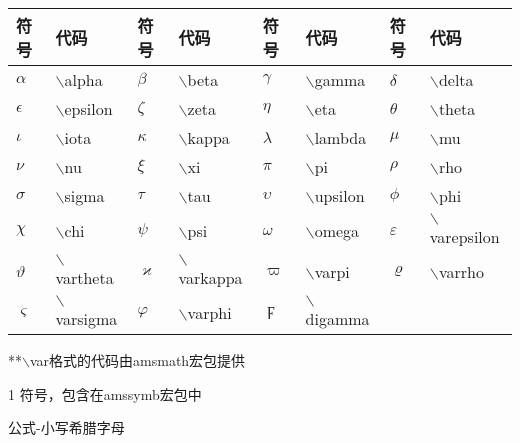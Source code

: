 \documentclass[UTF8,fontset=ubuntu]{ctexart}
\begin{document}
\begin{threeparttable}
\begin{tabular}{l l l l l l l l}
	\hline
	符号 & 代码 & 符号 & 代码 & 符号 & 代码 & 符号 & 代码\\
	\hline
	$\alpha$ & $\backslash$alpha & $\beta$ & $\backslash$beta & $\gamma$ & $\backslash$gamma & $\delta$ & $\backslash$delta\\
	$\epsilon$ & $\backslash$epsilon & $\zeta$ & $\backslash$zeta & $\eta$ & $\backslash$eta & $\theta$ & $\backslash$theta\\
	$\iota$ & $\backslash$iota & $\kappa$ & $\backslash$kappa & $\lambda$ & $\backslash$lambda & $\mu$ & $\backslash$mu\\
	$\nu$ & $\backslash$nu & $\xi$ & $\backslash$xi & $\pi$ & $\backslash$pi & $\rho$ & $\backslash$rho\\
	$\sigma$ & $\backslash$sigma & $\tau$ & $\backslash$tau & $\upsilon$ & $\backslash$upsilon & $\phi$ & $\backslash$phi\\
	$\chi$ & $\backslash$chi & $\psi$ & $\backslash$psi & $\omega$ & $\backslash$omega & $\varepsilon$ & $\backslash$varepsilon\\
	$\vartheta$ & $\backslash$vartheta & $\varkappa$ & $\backslash$varkappa\tnote{1} & $\varpi$ & $\backslash$varpi & $\varrho$ & $\backslash$varrho\tnote{1}\\
	$\varsigma$ & $\backslash$varsigma & $\varphi$ & $\backslash$varphi & $\digamma$ & $\backslash$digamma\tnote{1}\\
	\hline
\end{tabular}
**$\backslash$var格式的代码由amsmath宏包提供
\begin{tablenotes}
	\item[1] \AMS 符号，包含在amssymb宏包中
\end{tablenotes}
\caption{公式-小写希腊字母}
\end{threeparttable}
\end{document}
